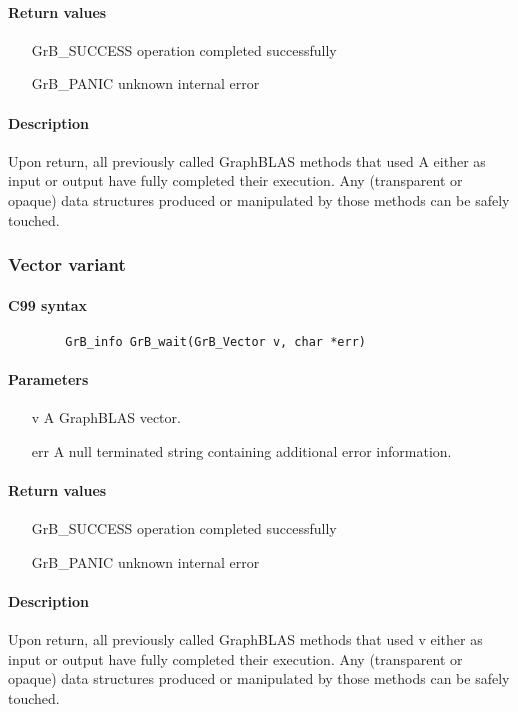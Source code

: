 \paragraph{Return values}
\begin{itemize}[leftmargin=2.1in]
\item[{\sf GrB\_SUCCESS}]	operation completed successfully
\item[{\sf GrB\_PANIC}]		unknown internal error
\end{itemize}

\paragraph{Description}

Upon return, all previously called GraphBLAS methods that used {\sf A} either as input or output have fully completed their execution.
Any (transparent or opaque) data structures produced or manipulated by those methods can be safely touched.

\subsubsection{Vector variant}

\paragraph{C99 syntax}

\begin{verbatim}
        GrB_info GrB_wait(GrB_Vector v, char *err)
\end{verbatim}

\paragraph{Parameters}

\begin{itemize}[leftmargin=1.1in]
	\item[{\sf v}]	     A GraphBLAS vector.
        \item[{\sf err}]     A null terminated string containing additional error
information.
\end{itemize}

\paragraph{Return values}
\begin{itemize}[leftmargin=2.1in]
\item[{\sf GrB\_SUCCESS}]	operation completed successfully
\item[{\sf GrB\_PANIC}]		unknown internal error
\end{itemize}

\paragraph{Description}

Upon return, all previously called GraphBLAS methods that used {\sf v} either as
input or output have fully completed their execution.  Any (transparent or opaque)
data structures produced or manipulated by those methods can be safely touched.
